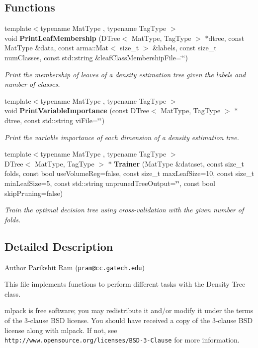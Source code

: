 \subsection*{Functions}
\begin{DoxyCompactItemize}
\item 
{\footnotesize template$<$typename Mat\+Type , typename Tag\+Type $>$ }\\void \textbf{ Print\+Leaf\+Membership} (D\+Tree$<$ Mat\+Type, Tag\+Type $>$ $\ast$dtree, const Mat\+Type \&data, const arma\+::\+Mat$<$ size\+\_\+t $>$ \&labels, const size\+\_\+t num\+Classes, const std\+::string \&leaf\+Class\+Membership\+File=\char`\"{}\char`\"{})
\begin{DoxyCompactList}\small\item\em Print the membership of leaves of a density estimation tree given the labels and number of classes. \end{DoxyCompactList}\item 
{\footnotesize template$<$typename Mat\+Type , typename Tag\+Type $>$ }\\void \textbf{ Print\+Variable\+Importance} (const D\+Tree$<$ Mat\+Type, Tag\+Type $>$ $\ast$dtree, const std\+::string vi\+File=\char`\"{}\char`\"{})
\begin{DoxyCompactList}\small\item\em Print the variable importance of each dimension of a density estimation tree. \end{DoxyCompactList}\item 
{\footnotesize template$<$typename Mat\+Type , typename Tag\+Type $>$ }\\D\+Tree$<$ Mat\+Type, Tag\+Type $>$ $\ast$ \textbf{ Trainer} (Mat\+Type \&dataset, const size\+\_\+t folds, const bool use\+Volume\+Reg=false, const size\+\_\+t max\+Leaf\+Size=10, const size\+\_\+t min\+Leaf\+Size=5, const std\+::string unpruned\+Tree\+Output=\char`\"{}\char`\"{}, const bool skip\+Pruning=false)
\begin{DoxyCompactList}\small\item\em Train the optimal decision tree using cross-\/validation with the given number of folds. \end{DoxyCompactList}\end{DoxyCompactItemize}


\subsection{Detailed Description}
\begin{DoxyAuthor}{Author}
Parikshit Ram ({\tt pram@cc.\+gatech.\+edu})
\end{DoxyAuthor}
This file implements functions to perform different tasks with the Density Tree class.

mlpack is free software; you may redistribute it and/or modify it under the terms of the 3-\/clause B\+SD license. You should have received a copy of the 3-\/clause B\+SD license along with mlpack. If not, see {\tt http\+://www.\+opensource.\+org/licenses/\+B\+S\+D-\/3-\/\+Clause} for more information. 